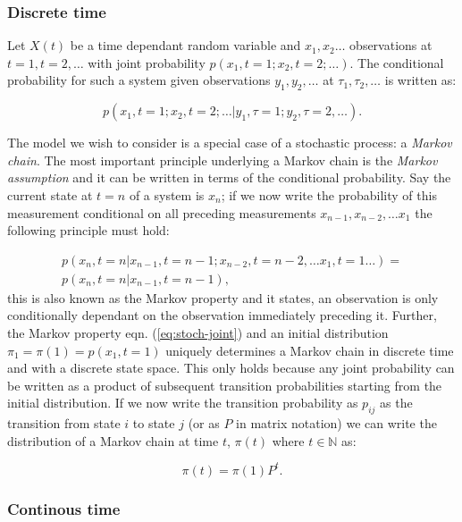 \subsubsection{Discrete time}

Let $X(t)$ be a time dependant random variable and $x_1, x_2 \ldots $ observations at $t=1, t =2, \ldots$ with joint probability $p(x_1, t=1; x_2, t=2; \ldots)$. The conditional probability for such a system given observations $y_1, y_2, \ldots$ at $\tau_1, \tau_2, \ldots $ is written as:

\begin{equation}
  \label{eq:stoch-joint-init}
  p(x_1, t=1; x_2, t=2; \ldots | y_1, \tau=1; y_2,\tau=2, \ldots).
\end{equation}

The model we wish to consider is a special case of a stochastic process: a \emph{Markov chain}. The most important principle underlying a Markov chain is the \emph{Markov assumption} and it can be written in terms of the conditional probability. Say the current state at $t=n$ of a system is $x_n$; if we now write the probability of this measurement conditional on all preceding measurements $x_{n-1}, x_{n-2}, \ldots x_1$ the following principle must hold:

\begin{multline}
  \label{eq:stoch-joint}
  p(x_n, t=n | x_{n-1}, t={n-1}; x_{n-2}, t={n-2}, \ldots x_1, t=1 \ldots) = \\ p(x_{n},t={n}| x_{n-1},t={n-1}),
\end{multline}
this is also known as the Markov property and it states, an observation is only conditionally dependant on the observation immediately preceding it. Further, the Markov property eqn. (\ref{eq:stoch-joint}) and an initial distribution $\pi_1 = \pi(1) = p(x_1,t=1)$ uniquely determines a Markov chain in discrete time and with a discrete state space. This only holds because any joint probability can be written as a product of subsequent transition probabilities starting from the initial distribution. If we now write the transition probability as $p_{ij}$ as the transition from state $i$ to state $j$ (or as $P$ in matrix notation) we can write the distribution of a Markov chain at time $t$, $\pi(t)$ where $t \in \mathbb{N}$ as:

\begin{equation}
  \label{eq:markov-chain}
  \pi(t) = \pi(1)P^t.
\end{equation}

\subsubsection{Continous time}
\label{sec:continous-time}


